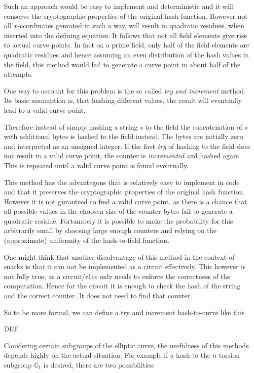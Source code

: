 Such an approach would be easy to implement and deterministic and it will conserve the cryptographic properties of the original hash function. However not all $x$-ccordinates genrated in such a way, will result in quadratic residues, when inserted into the defining equation. It follows that not all field elements give rise to actual curve points. In fact
on a prime field, only half of the field elements are quadratic residues and hence assuming an even distribution of the hash values in the field, this method would fail to generate a curve point in about half of the attempts. 

One way to account for this problem is the so called \textit{try and increment} method. Its basic assumption is, that hashing different values, the result will eventually lead to a valid curve point. 

Therefore instead of simply hashing a string $s$ to the field the concatenation of $s$ with additional bytes is hashed to the field instead. The bytes are initially zero and interpreted as an unsigned integer. If the first \textit{try} of hashing to the field does not result in a valid curve point, the counter is \textit{incremented} and hashed again. This is repeated until a valid curve point is found eventually.

This method has the advantegous that is relatively easy to implement in code and that it preserves the cryptographic properties of the original hash function. However it is not guranteed to find a valid curve point, as there is a chance that all possible values in the choosen size of the counter bytes fail to generate a quadratic residue. Fortunately it is possible to make the probability for this arbitrarily small by choosing large enough counters and relying on the (approximate) uniformity of the hash-to-field function. 

One might think that another disadvantage of this method in the context of snarks is that it can not be implemented as a circuit effectively. This however is not fully true, as a circuit/r1cs only needs to enforce the correctness of the computation. Hence for the circuit it is enough to check the hash of the string and the correct counter. It does not need to find that counter.

So to be more formal, we can define a try and increment hash-to-curve like this

DEF


Conidering certain subgroups of the elliptic curve, the usefulness of this methods depends highly on the actual situation. For example if a hash to the $n$-torsion subgroup $\mathbb{G}_1$ is desired, there are two possibilities: 

